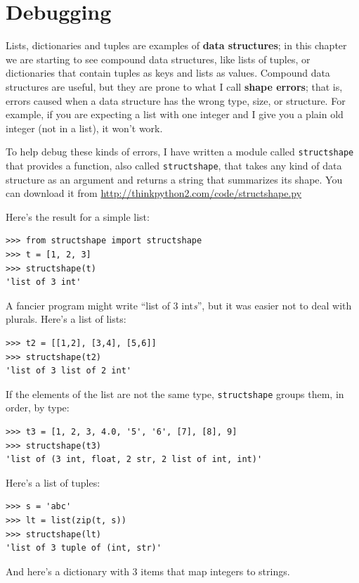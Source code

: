 \documentclass[10pt]{book}
\begin{document}
\section{Debugging}

Lists, dictionaries and tuples are examples of {\bf data
  structures}; in this chapter we are starting to see compound data
structures, like lists of tuples, or dictionaries that contain tuples
as keys and lists as values.  Compound data structures are useful, but
they are prone to what I call {\bf shape errors}; that is, errors
caused when a data structure has the wrong type, size, or structure.
For example, if you are expecting a list with one integer and I
give you a plain old integer (not in a list), it won't work.

To help debug these kinds of errors, I have written a module
called {\tt structshape} that provides a function, also called
{\tt structshape}, that takes any kind of data structure as
an argument and returns a string that summarizes its shape.
You can download it from \url{http://thinkpython2.com/code/structshape.py}

Here's the result for a simple list:

\begin{verbatim}
>>> from structshape import structshape
>>> t = [1, 2, 3]
>>> structshape(t)
'list of 3 int'
\end{verbatim}
%
A fancier program might write ``list of 3 int{\em s}'', but it
was easier not to deal with plurals.  Here's a list of lists:

\begin{verbatim}
>>> t2 = [[1,2], [3,4], [5,6]]
>>> structshape(t2)
'list of 3 list of 2 int'
\end{verbatim}
%
If the elements of the list are not the same type,
{\tt structshape} groups them, in order, by type:

\begin{verbatim}
>>> t3 = [1, 2, 3, 4.0, '5', '6', [7], [8], 9]
>>> structshape(t3)
'list of (3 int, float, 2 str, 2 list of int, int)'
\end{verbatim}
%
Here's a list of tuples:

\begin{verbatim}
>>> s = 'abc'
>>> lt = list(zip(t, s))
>>> structshape(lt)
'list of 3 tuple of (int, str)'
\end{verbatim}
%
And here's a dictionary with 3 items that map integers to strings.
\end{document}
